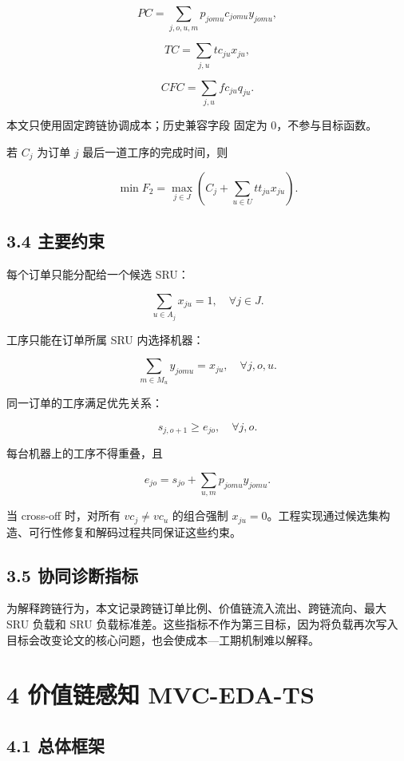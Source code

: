 \documentclass[UTF8,11pt]{ctexart}
\begin{document}
\[
PC=\sum_{j,o,u,m}p_{jomu}c_{jomu}y_{jomu},
\]

\[
TC=\sum_{j,u}tc_{ju}x_{ju},
\]

\[
CFC=\sum_{j,u}fc_{ju}q_{ju}.
\]

本文只使用固定跨链协调成本；历史兼容字段 \texttt{} 固定为 0，不参与目标函数。

若 \(C_j\) 为订单 \(j\) 最后一道工序的完成时间，则

\[
\min F_2=\max_{j\in J}\left(C_j+\sum_{u\in U}tt_{ju}x_{ju}\right).
\]

\subsection*{3.4 主要约束}

每个订单只能分配给一个候选 SRU：

\[
\sum_{u\in A_j}x_{ju}=1,\quad \forall j\in J.
\]

工序只能在订单所属 SRU 内选择机器：

\[
\sum_{m\in M_u}y_{jomu}=x_{ju},\quad \forall j,o,u.
\]

同一订单的工序满足优先关系：

\[
s_{j,o+1}\ge e_{jo},\quad \forall j,o.
\]

每台机器上的工序不得重叠，且

\[
e_{jo}=s_{jo}+\sum_{u,m}p_{jomu}y_{jomu}.
\]

当 cross-off 时，对所有 \(vc_j\ne vc_u\) 的组合强制 \(x_{ju}=0\)。工程实现通过候选集构造、可行性修复和解码过程共同保证这些约束。

\subsection*{3.5 协同诊断指标}

为解释跨链行为，本文记录跨链订单比例、价值链流入流出、跨链流向、最大 SRU 负载和 SRU 负载标准差。这些指标不作为第三目标，因为将负载再次写入目标会改变论文的核心问题，也会使成本—工期机制难以解释。

\section*{4 价值链感知 MVC-EDA-TS}

\subsection*{4.1 总体框架}
\end{document}
